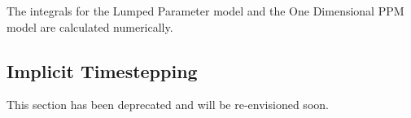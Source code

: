 The integrals for the Lumped Parameter model and the One Dimensional PPM model 
are calculated numerically.

\subsection{Implicit Timestepping}

This section has been deprecated and will be re-envisioned soon.

%
%
%      
%
%
%
%
%
%
